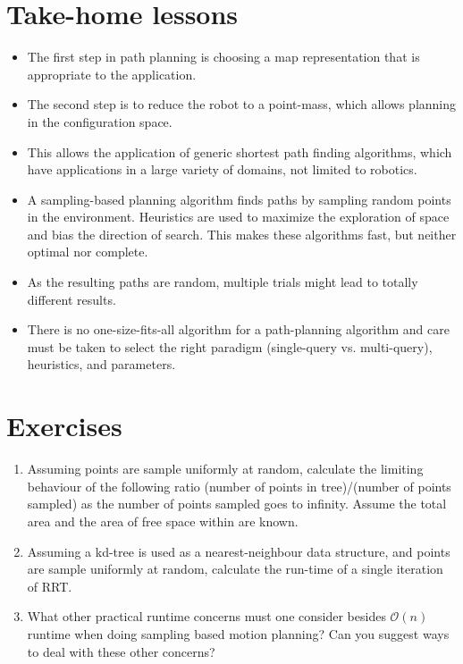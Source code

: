 \section*{Take-home lessons}
\begin{itemize}
\item The first step in path planning is choosing a map representation that is appropriate to the application.
\item The second step is to reduce the robot to a point-mass, which allows planning in the configuration space.
\item This allows the application of generic shortest path finding algorithms, which have applications in a large variety of domains, not limited to robotics.
\item A sampling-based planning algorithm finds paths by sampling random points in the environment. Heuristics are used to maximize the exploration of space and bias the direction of search. This makes these algorithms fast, but neither optimal nor complete.
\item As the resulting paths are random, multiple trials might lead to totally different results.
\item There is no one-size-fits-all algorithm for a path-planning algorithm and care must be taken to select the right paradigm (single-query vs. multi-query), heuristics, and parameters.
\end{itemize}

\section*{Exercises}\small
\begin{enumerate}
\item Assuming points are sample uniformly at random, calculate the limiting behaviour of the following ratio   (number of points in tree)/(number of points sampled) as the number of points sampled goes to infinity. Assume the total area and the area of free space within are known. 

\item Assuming a kd-tree is used as a nearest-neighbour data structure, and points are sample uniformly at random, calculate the  run-time of a single iteration of RRT.

\item What other practical runtime concerns must one consider besides $\mathcal{O}(n)$ runtime when doing sampling based motion planning? Can you suggest ways to deal with these other concerns?
\end{enumerate}

\normalsize